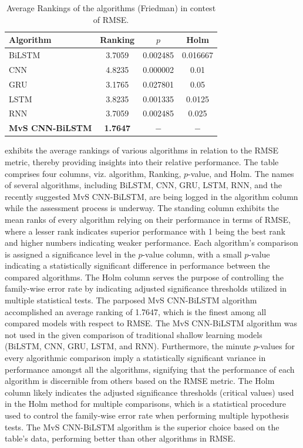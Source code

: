 \documentclass[a4paper, fleqn]{cas-sc}
\theoremstyle{definition}
\theoremstyle{remark}
\begin{document}
\begin{table}[!htp]
  \caption{Average Rankings of the algorithms (Friedman) in contest of RMSE.}
  \centering
  \begin{tabular}{lccc}
  \hline
  Algorithm&Ranking&$p$&Holm\\\hline
  BiLSTM&3.7059&0.002485&0.016667\\
  CNN&4.8235&0.000002&0.01\\
  GRU&3.1765&0.027801&0.05\\
  LSTM&3.8235&0.001335&0.0125\\
  RNN&3.7059&0.002485&0.025\\
  \textbf{MvS CNN-BiLSTM}&\textbf{1.7647}&$-$ &$-$ \\\hline
\end{tabular}
\label{rank_rmse}
  \end{table}
   exhibits the average rankings of various algorithms in relation to the RMSE metric,  thereby providing insights into their relative performance. The table comprises four columns,  viz. algorithm,  Ranking,  $p$-value,  and Holm. The names of several algorithms,  including BiLSTM,  CNN,  GRU,  LSTM,  RNN,  and the recently suggested MvS CNN-BiLSTM,  are being logged in the algorithm column while the assessment process is underway. The standing column exhibits the mean ranks of every algorithm relying on their performance in terms of RMSE,  where a lesser rank indicates superior performance with 1 being the best rank and higher numbers indicating weaker performance. Each algorithm's comparison is assigned a significance level in the $p$-value column,  with a small $p$-value indicating a statistically significant difference in performance between the compared algorithms. The Holm column serves the purpose of controlling the family-wise error rate by indicating adjusted significance thresholds utilized in multiple statistical tests. The parposed MvS CNN-BiLSTM algorithm accomplished an average ranking of 1.7647,  which is the finest among all compared models with respect to RMSE. The MvS CNN-BiLSTM algorithm was not used in the given comparison of traditional shallow learning models (BiLSTM,  CNN,  GRU,  LSTM,  and RNN). Furthermore,  the minute $p$-values for every algorithmic comparison imply a statistically significant variance in performance amongst all the algorithms,  signifying that the performance of each algorithm is discernible from others based on the RMSE metric. The Holm column likely indicates the adjusted significance thresholds (critical values) used in the Holm method for multiple comparisons,  which is a statistical procedure used to control the family-wise error rate when performing multiple hypothesis tests. The MvS CNN-BiLSTM algorithm is the superior choice based on the table's data,  performing better than other algorithms in RMSE.
\end{document}
